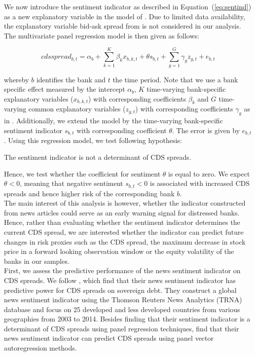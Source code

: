 We now introduce the sentiment indicator as described in \mbox{Equation~(\ref{eq:sentind})} as a new explanatory variable in the model of \cite{annaert2013}. Due to limited data availability, the explanatory variable bid-ask spread from \cite{annaert2013} is not considered in our analysis. The multivariate panel regression model is then given as follows:

\begin{equation}
	cdsspread_{b,t} = \alpha_b + \sum_{k=1}^K\beta_{k}x_{b,k,t} + \theta s_{b,t} + \sum_{g=1}^G\gamma_gz_{g,t}+e_{b,t}
\end{equation}

whereby $b$ identifies the bank and $t$ the time period. Note that we use a bank specific effect measured by the intercept $\alpha_b$, $K$ time-varying bank-specific explanatory variables ($x_{b,k,t}$) with corresponding coefficients $\beta_k$ and $G$ time-varying common explanatory variables ($z_{g,t}$) with corresponding coefficients $\gamma_g$ as in \cite{annaert2013}. Additionally, we extend the model by the time-varying bank-specific sentiment indicator $s_{b,t}$ with corresponding coefficient $\theta$. The error is given by $e_{b,t}$. Using this regression model, we test following hypothesis:

\begin{hyp}
	The sentiment indicator is not a determinant of CDS spreads.
\end{hyp}

Hence, we test whether the coefficient for sentiment $\theta$ is equal to zero. We expect $\theta<0$, meaning that negative sentiment $s_{b,t}<0$ is associated with increased CDS spreads and hence higher risk of the corresponding bank $b$. \\

The main interest of this analysis is however, whether the indicator constructed from news articles could serve as an early warning signal for distressed banks. Hence, rather than evaluating whether the sentiment indicator determines the current CDS spread, we are interested whether the indicator can predict future changes in risk proxies such as the CDS spread, the maximum decrease in stock price in a forward looking observation window or the equity volatility of the banks in our samples. \\

First, we assess the predictive performance of the news sentiment indicator on CDS spreads. We follow \cite{cathcart2020}, which find that their news sentiment indicator has predictive power for CDS spreads on sovereign debt. They construct a global news sentiment indicator using the Thomson Reuters News Analytics (TRNA) database and focus on 25 developed and less developed countries from various geographies from 2003 to 2014. Besides finding that their sentiment indicator is a determinant of CDS spreads using panel regression techniques, \cite{cathcart2020} find that their news sentiment indicator can predict CDS spreads using panel vector autoregression methods. \\

